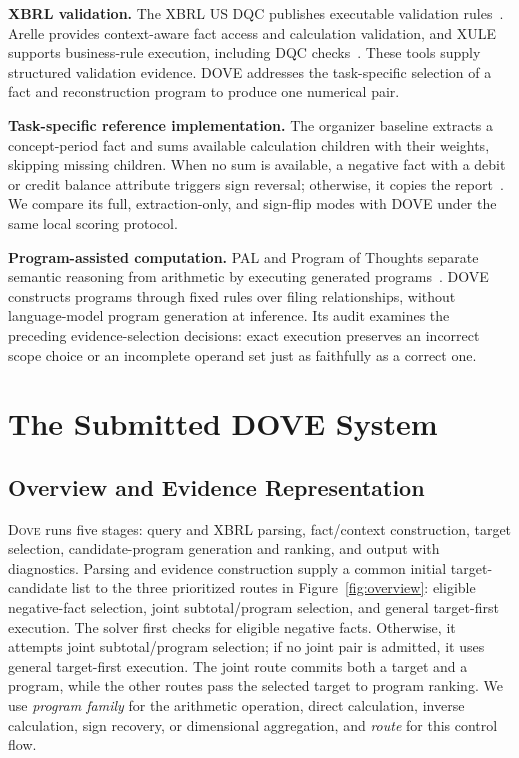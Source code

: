 \documentclass[conference]{IEEEtran}
\newcommand{\dove}{\textsc{Dove}}
\begin{document}
\noindent\textbf{XBRL validation.}
The XBRL US DQC publishes executable validation rules~\cite{dqcusrules,dqcimplementation}. Arelle provides context-aware fact access and calculation validation, and XULE supports business-rule execution, including DQC checks~\cite{arelle,xule}. These tools supply structured validation evidence. DOVE addresses the task-specific selection of a fact and reconstruction program to produce one numerical pair.

\noindent\textbf{Task-specific reference implementation.}
The organizer baseline extracts a concept-period fact and sums available calculation children with their weights, skipping missing children. When no sum is available, a negative fact with a debit or credit balance attribute triggers sign reversal; otherwise, it copies the report~\cite{task3baseline,task3rulecode}. We compare its full, extraction-only, and sign-flip modes with DOVE under the same local scoring protocol.

\noindent\textbf{Program-assisted computation.}
PAL and Program of Thoughts separate semantic reasoning from arithmetic by executing generated programs~\cite{pmlr-v202-gao23f,chen2023pot}. DOVE constructs programs through fixed rules over filing relationships, without language-model program generation at inference. Its audit examines the preceding evidence-selection decisions: exact execution preserves an incorrect scope choice or an incomplete operand set just as faithfully as a correct one.

\section{The Submitted DOVE System}
\label{sec:system}

\subsection{Overview and Evidence Representation}
\label{sec:overview}

\dove{} runs five stages: query and XBRL parsing, fact/context construction, target selection, candidate-program generation and ranking, and output with diagnostics. Parsing and evidence construction supply a common initial target-candidate list to the three prioritized routes in Figure~\ref{fig:overview}: eligible negative-fact selection, joint subtotal/program selection, and general target-first execution. The solver first checks for eligible negative facts. Otherwise, it attempts joint subtotal/program selection; if no joint pair is admitted, it uses general target-first execution. The joint route commits both a target and a program, while the other routes pass the selected target to program ranking. We use \emph{program family} for the arithmetic operation, direct calculation, inverse calculation, sign recovery, or dimensional aggregation, and \emph{route} for this control flow.
\end{document}
